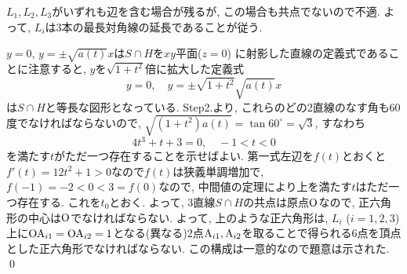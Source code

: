 $L_1,L_2,L_3$がいずれも辺を含む場合が残るが, この場合も共点でないので不適. よって, $L_i$は3本の最長対角線の延長であることが従う.
\begin{center}
\end{center}
 $y=0$, $y=\pm \sqrt{a(t)} x$は$S\cap H$を$xy$平面($z=0$) に射影した直線の定義式であることに注意すると, $y$を$\sqrt{1+t^2}$倍に拡大した定義式
\[
y=0,\quad y = \pm \sqrt{1+t^2}\sqrt{a(t)}x
\]
は$S\cap H$と等長な図形となっている.
Step2.より, これらのどの2直線のなす角も60度でなければならないので, $\sqrt{(1+t^2)a(t)} = \tan{60^{\circ}} = \sqrt{3}$, すなわち
\[
4t^3 + t + 3 = 0,\quad -1 < t < 0
\]
を満たす$t$がただ一つ存在することを示せばよい. 第一式左辺を$f(t)$とおくと$f'(t) = 12t^2 + 1 > 0$なので$f(t)$は狭義単調増加で, $f(-1) = -2 < 0 < 3 = f(0)$なので, 中間値の定理により上を満たす$t$はただ一つ存在する. これを$t_0$とおく. よって,
3直線$S\cap H$の共点は原点${\rm O}$なので, 正六角形の中心は${\rm O}$でなければならない. よって, 上のような正六角形は, $L_i$ ($i=1,2,3$)上に${\rm OA}_{i1} = {\rm OA}_{i2} = 1$となる(異なる)2点${\rm A}_{i1}, {\rm A}_{i2}$を取ることで得られる6点を頂点とした正六角形でなければならない. この構成は一意的なので題意は示された. \qed

